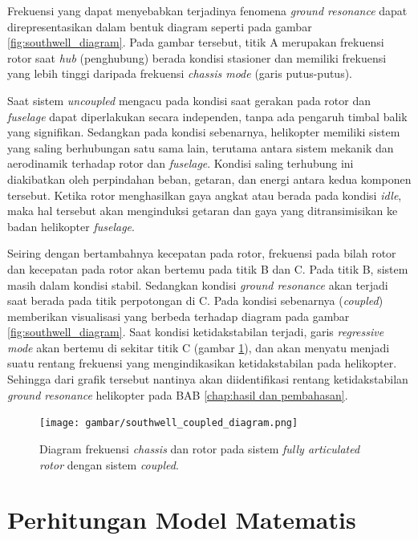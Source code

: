 Frekuensi yang dapat menyebabkan terjadinya fenomena \textit{ground resonance} dapat direpresentasikan dalam bentuk diagram seperti pada gambar \ref{fig:southwell_diagram}. Pada gambar tersebut, titik A merupakan frekuensi rotor saat \textit{hub} (penghubung) berada kondisi stasioner dan memiliki frekuensi yang lebih tinggi daripada frekuensi \textit{chassis mode} (garis putus-putus). 

Saat sistem \textit{uncoupled} mengacu pada kondisi saat gerakan pada rotor dan \textit{fuselage} dapat diperlakukan secara independen, tanpa ada pengaruh timbal balik yang signifikan. Sedangkan pada kondisi sebenarnya, helikopter memiliki sistem yang saling berhubungan satu sama lain, terutama antara sistem mekanik dan aerodinamik terhadap rotor dan \textit{fuselage}. Kondisi saling terhubung ini diakibatkan oleh perpindahan beban, getaran, dan energi antara kedua komponen tersebut. Ketika rotor menghasilkan gaya angkat atau berada pada kondisi \textit{idle}, maka hal tersebut akan menginduksi getaran dan gaya yang ditransimisikan ke badan helikopter \textit{fuselage}. 

Seiring dengan bertambahnya kecepatan pada rotor, frekuensi pada bilah rotor dan kecepatan pada rotor akan bertemu pada titik B dan C. Pada titik B, sistem masih dalam kondisi stabil. Sedangkan kondisi \textit{ground resonance} akan terjadi saat berada pada titik perpotongan di C. Pada kondisi sebenarnya (\textit{coupled}) memberikan visualisasi yang berbeda terhadap diagram pada gambar \ref{fig:southwell_diagram}. Saat kondisi ketidakstabilan terjadi, garis \textit{regressive mode} akan bertemu di sekitar titik C (gambar \ref{fig:southwell_coupled_diagram}), dan akan menyatu menjadi suatu rentang frekuensi yang mengindikasikan ketidakstabilan pada helikopter. Sehingga dari grafik tersebut nantinya akan diidentifikasi rentang ketidakstabilan \textit{ground resonance} helikopter pada BAB \ref{chap:hasil dan pembahasan}.

\begin{figure}[H]
	\centering
	\texttt{[image: gambar/southwell\_coupled\_diagram.png]}
	\caption{Diagram frekuensi \textit{chassis} dan rotor pada sistem \textit{fully articulated rotor} dengan sistem \textit{coupled}\cite{bramwell2001bramwell}.}
	\label{fig:southwell_coupled_diagram}
\end{figure}


\section{Perhitungan Model Matematis}
\label{Matematis}

